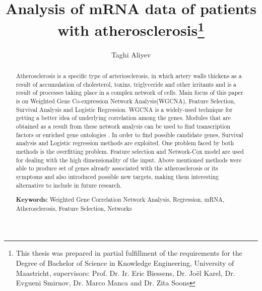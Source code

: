 \documentclass{ba-kecs}
\numberwithin{figure}{section}
\numberwithin{equation}{section}
\begin{document}
\title{Analysis of mRNA data of patients with atherosclerosis\footnote{This thesis was prepared in partial fulfillment of the requirements
 for the Degree of Bachelor of Science in Knowledge Engineering,
University of Maastricht,  supervisors: Prof. Dr. Ir. Eric Biessens, Dr. Jo\"{e}l Karel, Dr. Evgueni Smirnov, Dr. Marco Manca and Dr. Zita Soons}}
\author{Taghi Aliyev \\}
\maketitle

\makeatletter
\let\ps@oldempty\ps@empty %
\renewcommand\ps@empty\ps@plain
\makeatother


\begin{abstract}
Atherosclerosis is a specific type of arteriosclerosis, in which artery walls thickens as a result of accumulation of cholesterol, toxins, triglyceride and other irritants and is a result of processes taking place in a complex network of cells. Main focus of this paper is on Weighted Gene Co-expression Network Analysis(WGCNA), Feature Selection, Survival Analysis and Logistic Regression. WGCNA is a widely-used technique for getting a better idea of underlying correlation among the genes. Modules that are obtained as a result from these network analysis can be used to find transcription factors or enriched gene ontologies . In order to find possible candidate genes, Survival analysis and Logistic regression methods are exploited. One problem faced by both methods is the overfitting problem. Feature selection and Network-Cox model are used for dealing with the high dimensionality of the input. Above mentioned methods were able to produce set of genes already associated with the atherosclerosis or its symptoms and also introduced possible new targets, making them interesting alternative to include in future research.

\smallskip
\noindent \textbf{Keywords: } Weighted Gene Correlation Network Analysis, Regression, mRNA, Atherosclerosis, Feature Selection, Networks
\end{abstract}

\end{document}
